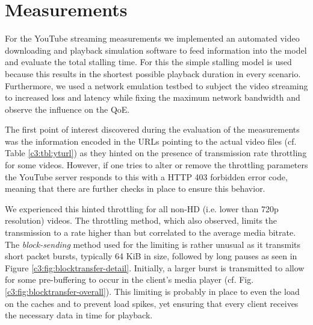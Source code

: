 



\section{Measurements}
\label{sec:measurements}


For the YouTube streaming measurements we implemented an automated video downloading and playback simulation software to feed information into the model and evaluate the total stalling time. For this the simple stalling model is used because this results in the shortest possible playback duration in every scenario. Furthermore, we used a network emulation testbed to subject the video streaming to increased loss and latency while fixing the maximum network bandwidth and observe the influence on the QoE.

The first point of interest discovered during the evaluation of the measurements was the information encoded in the URLs pointing to the actual video files (cf. Table \ref{c3:tbl:yturl}) as they hinted on the presence of transmission rate throttling for some videos. However, if one tries to alter or remove the throttling parameters the YouTube server responds to this with a HTTP 403 forbidden error code, meaning that there are further checks in place to ensure this behavior. 

We experienced this hinted throttling for all non-HD (i.e. lower than 720p resolution) videos. The throttling method, which \cite{alcock2011afcyt} also observed, limits the transmission to a rate higher than but correlated to the average media bitrate. The \textit{block-sending} method used for the limiting is rather unusual as it transmits short packet bursts, typically 64 KiB in size, followed by long pauses as seen in Figure \ref{c3:fig:blocktransfer-detail}. Initially, a larger burst is transmitted to allow for some pre-buffering to occur in the client's media player (cf. Fig. \ref{c3:fig:blocktransfer-overall}). This limiting is probably in place to even the load on the caches and to prevent load spikes, yet ensuring that every client receives the necessary data in time for playback.



